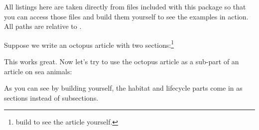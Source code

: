 
All listings here are taken directly from files included with this package so that you can access those files and build them yourself to see the examples in action.
All paths are relative to .

Suppose we write an octopus article with two sections:\footnote{build  to see the article yourself.}








This works great.
Now let's try to use the octopus article as a sub-part of an article on sea animals:


As you can see by building  yourself, the habitat and lifecycle parts come in as sections instead of subsections.

